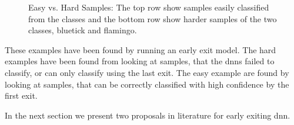 \begin{figure}
	\captionsetup[subfigure]{justification=centering}
	\centering
	\hfill
	\caption[Easy vs. Hard Samples]{Easy vs. Hard Samples: The top row show samples easily classified from the classes and the bottom row show harder samples of the two classes, \protect{} bluetick and \protect{} flamingo. }
	\label{fig:hardvseasy}
\end{figure}

 These examples have been found by running an early exit model. The hard examples have been found from looking at samples, that the \gls{dnn}s failed to classify, or can only classify using the last exit. The easy example are found by looking at samples, that can be correctly classified with high confidence by the first exit. 
 
 In the next section we present two proposals in literature for early exiting \gls{dnn}.




